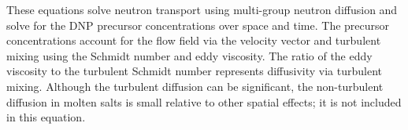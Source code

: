 These equations solve neutron transport using multi-group neutron diffusion and solve for the \gls{DNP} precursor concentrations over space and time.
The precursor concentrations account for the flow field via the velocity vector and turbulent mixing using the Schmidt number and eddy viscosity.
The ratio of the eddy viscosity to the turbulent Schmidt number represents diffusivity via turbulent mixing.
Although the turbulent diffusion can be significant, the non-turbulent diffusion in molten salts is small relative to other spatial effects; it is not included in this equation.



